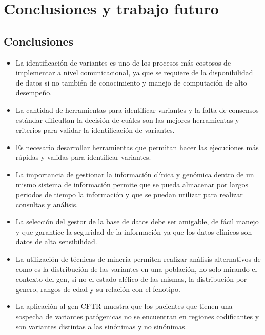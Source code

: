 \chapter{Conclusiones y trabajo futuro}

\section{Conclusiones}

\begin{itemize}
	\item La identificación de variantes es uno de los procesos más costosos de implementar a nivel comunicacional, ya que se requiere de la disponibilidad de datos si no también de conocimiento y manejo de computación de alto desempeño.
	
	\item La cantidad de herramientas para identificar variantes y la falta de consensos estándar dificultan la decisión de cuáles son las mejores herramientas y criterios para validar la identificación de variantes.
	
	\item Es necesario desarrollar herramientas que permitan hacer las ejecuciones más rápidas y validas para identificar variantes. 
	
	\item La importancia de gestionar la información clínica y genómica dentro de un mismo sistema de información permite que se pueda almacenar por largos periodos de tiempo la información y  que se puedan utilizar para realizar consultas y análisis. 
	
	\item La selección del gestor de la base de datos debe ser amigable, de fácil manejo y que garantice la seguridad de la información ya que los datos clínicos son datos de alta sensibilidad.
	
	\item La utilización de técnicas de minería permiten realizar análisis alternativos de como es la distribución de las variantes en una población, no solo mirando el contexto del gen, si no el estado alélico de las mismas, la distribución por genero, rangos de edad y su relación con el fenotipo.
	
	\item La aplicación al gen CFTR muestra que los pacientes que tienen una sospecha de variantes patógenicas no se encuentran en regiones codificantes y son variantes distintas a las sinónimas y no sinónimas.
	

\end{itemize}
